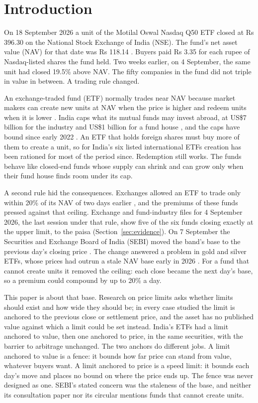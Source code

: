 \documentclass[10pt,journal,a4paper]{IEEEtran}
\theoremstyle{definition}
\begin{document}
\section{Introduction}
On 18 September 2026 a unit of the Motilal Oswal Nasdaq Q50 ETF closed at Rs 396.30 on the National Stock Exchange of India (NSE). The fund's net asset value (NAV) for that date was Rs 118.14 \citep{indmoney2026unwind}. Buyers paid Rs 3.35 for each rupee of Nasdaq-listed shares the fund held. Two weeks earlier, on 4 September, the same unit had closed 19.5\% above NAV. The fifty companies in the fund did not triple in value in between. A trading rule changed.

An exchange-traded fund (ETF) normally trades near NAV because market makers can create new units at NAV when the price is higher and redeem units when it is lower \citep{bendavid2017exchange}. India caps what its mutual funds may invest abroad, at US\$7 billion for the industry and US\$1 billion for a fund house \citep{bs2021limit}, and the caps have bound since early 2022 \citep{pti2022resume}. An ETF that holds foreign shares must buy more of them to create a unit, so for India's six listed international ETFs creation has been rationed for most of the period since. Redemption still works. The funds behave like closed-end funds whose supply can shrink and can grow only when their fund house finds room under its cap.

A second rule hid the consequences. Exchanges allowed an ETF to trade only within 20\% of its NAV of two days earlier \citep{sebi2026circular}, and the premiums of these funds pressed against that ceiling. Exchange and fund-industry files for 4 September 2026, the last session under that rule, show five of the six funds closing exactly at the upper limit, to the paisa (Section~\ref{sec:evidence}). On 7 September the Securities and Exchange Board of India (SEBI) moved the band's base to the previous day's closing price \citep{sebi2026circular,sebi2026ext}. The change answered a problem in gold and silver ETFs, whose prices had outrun a stale NAV base early in 2026 \citep{sebi2026cp}. For a fund that cannot create units it removed the ceiling: each close became the next day's base, so a premium could compound by up to 20\% a day.

This paper is about that base. Research on price limits asks whether limits should exist and how wide they should be; in every case studied the limit is anchored to the previous close or settlement price, and the asset has no published value against which a limit could be set instead. India's ETFs had a limit anchored to value, then one anchored to price, in the same securities, with the barrier to arbitrage unchanged. The two anchors do different jobs. A limit anchored to value is a fence: it bounds how far price can stand from value, whatever buyers want. A limit anchored to price is a speed limit: it bounds each day's move and places no bound on where the price ends up. The fence was never designed as one. SEBI's stated concern was the staleness of the base, and neither its consultation paper nor its circular mentions funds that cannot create units.
\end{document}

